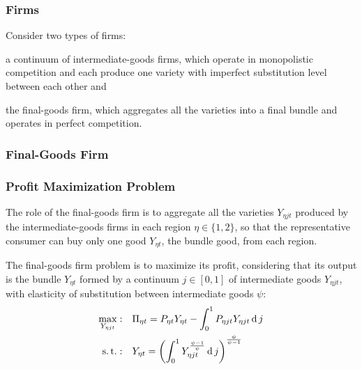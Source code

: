 \documentclass[../thesis.tex]{subfiles}
\begin{document}

\subsubsection*{Firms}

Consider two types of firms: 
\begin{enumerate*}[label=(\arabic*)]
	\item a continuum of intermediate-goods firms, which operate in monopolistic competition and each produce one variety with imperfect substitution level between each other and
	
	\item the final-goods firm, which aggregates all the varieties into a final bundle and operates in perfect competition.
\end{enumerate*}


\subsubsection{Final-Goods Firm}

\subsubsection*{Profit Maximization Problem}

The role of the final-goods firm is to aggregate all the varieties $Y_{\eta jt}$ produced by the intermediate-goods firms in each region $\eta \in \{1,2\}$, so that the representative consumer can buy only one good $Y_{\eta t}$, the bundle good, from each region.



The final-goods firm problem is to maximize its profit, considering that its output is the bundle $Y_{\eta t}$ formed by a continuum $j \in [0,1]$ of intermediate goods $Y_{\eta jt}$, with elasticity of substitution between intermediate goods $\psi$:
\begin{align}
	\max_{Y_{\eta jt}}: &\quad \Pi_{\eta t} = P_{\eta t} Y_{\eta t} - \int_{0}^{1} P_{\eta jt} Y_{\eta jt} \operatorname{d} j \label{eq_v2:reg-final-goods-firm-max-problem} \\
	\operatorname{s.t.}: & \quad Y_{\eta t} = \left( \int_{0}^{1} Y_{\eta jt}^{\frac{\psi-1}{\psi}} \operatorname{d} j \right)^{\frac{\psi}{\psi-1}} \label{eq_v2:reg-final-goods-firm-bundle-rule}
\end{align}
\end{document}
